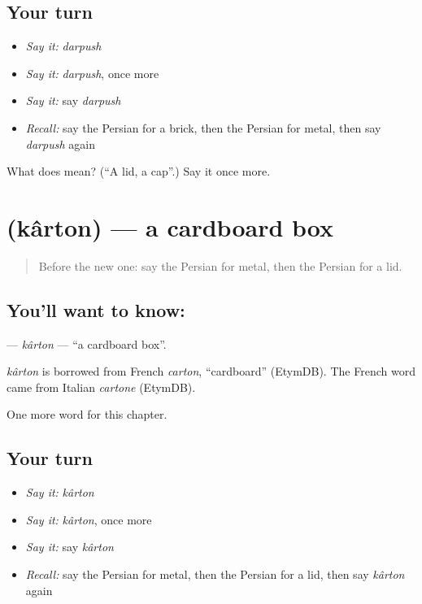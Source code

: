 \subsection*{Your turn}
\begin{itemize}
\raggedright
  \item \emph{Say it:} \emph{darpush}
  \item \emph{Say it:} \emph{darpush}, once more
  \item \emph{Say it:} say \emph{darpush}
  \item \emph{Recall:} say the Persian for a brick, then the Persian for metal, then say \emph{darpush} again
\end{itemize}

\begin{tcolorbox}[breakable,colback=teal!4,colframe=teal!35!black,title={Before you move on}]
What does  mean? (\textquotedblleft{}A lid, a cap\textquotedblright{}.) Say it once more.
\end{tcolorbox}
\section[\texorpdfstring{\fa{کارتن} (kârton)}{کارتن (kârton)}]{ (kârton) — a cardboard box}

\label{lesson:FA-C212-karton}



\begin{quote}
Before the new one: say the Persian for metal, then the Persian for a lid.
\end{quote}

\subsection*{You'll want to know: }
\textbf{} — \emph{kârton} — \textquotedblleft{}a cardboard box\textquotedblright{}.

\begin{cousinweb}
\emph{kârton} is borrowed from French \emph{carton}, \textquotedblleft{}cardboard\textquotedblright{} (EtymDB). The French word came from Italian \emph{cartone} (EtymDB).
\end{cousinweb}

\begin{grammarlens}[title={What you've built}]
One more word for this chapter.
\end{grammarlens}

\subsection*{Your turn}
\begin{itemize}
\raggedright
  \item \emph{Say it:} \emph{kârton}
  \item \emph{Say it:} \emph{kârton}, once more
  \item \emph{Say it:} say \emph{kârton}
  \item \emph{Recall:} say the Persian for metal, then the Persian for a lid, then say \emph{kârton} again
\end{itemize}

